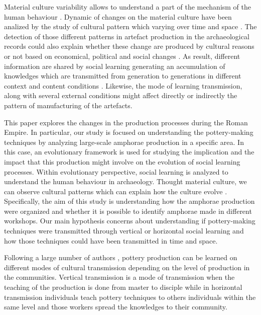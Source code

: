 \documentclass[review]{elsarticle}
\newcommand{\memo}[2]{\textcolor{#1}{#2}}
\newcommand{\xavi}[1]{\memo{orange}{xavi: #1\\}}
\begin{document}
Material culture variability allows to understand a part of the mechanism of the human behaviour \citep{richerson2005not, schillinger_copying_2016}. Dynamic of changes on the material culture have been analized by the study of cultural pattern which varying over time and space \citep{eerkens_jelmer_cultural_2007, lycett_cultural_2015}. The detection of those  different patterns in artefact production in the archaeological records could also explain whether these change are produced by cultural reasons or not based on economical, political and social changes \citep{basalla1988evolution}. As result, different information are shared by social learning generating an accumulation of knowledges which are transmitted from generation to generations in different context and content conditions  \citep{eerkens_jelmer_cultural_2005, neff1992ceramics,henrich_evolution_2003, boyd_cultural_2011}. Likewise, the mode of learning transmission, along with several external conditions might affect directly or indirectly the pattern of manufacturing of the artefacts. 


This paper explores the changes in the production processes during the Roman Empire. In particular, our study is focused on understanding the pottery-making techniques by analyzing large-scale amphorae production in a specific area. In this case, an evolutionary framework is used for studying the implication and the impact that this production might involve on the  evolution of social learning processes.  Within evolutionary perspective, social learning is analyzed to understand the human behaviour in archaeology. Thought material culture, we can observe cultural patterns which can explain how the culture evolve \citep{richerson2005not}. Specifically, the aim of this study is understanding how the amphorae production were organized and whether it is possible to identify amphorae made in different workshops. Our main hypothesis concerns about understanding if pottery-making techniques were transmitted through vertical or horizontal social learning and how those techniques could have been transmitted in time and space. 

Following a large number of authors \citep{cavalli-sforza_cultural_1981, hosfield_modes_2009}, pottery production can be learned on different modes of cultural transmission depending on the level of production in the communities. Vertical transmission is a mode of transmission when the teaching of the production is done from master to disciple  while in horizontal transmission individuals teach pottery techniques to others individuals within the same level and those workers spread the knowledges to their community. 
\end{document}
